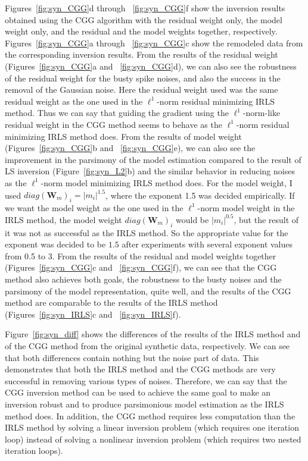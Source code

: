 Figures~\ref{fig:syn_CGG}d through ~\ref{fig:syn_CGG}f show the inversion results 
obtained using the CGG algorithm with the residual weight only,
the model weight only, and the residual and the model weights together, respectively.  
Figures~\ref{fig:syn_CGG}a through ~\ref{fig:syn_CGG}c show the remodeled data 
from the corresponding inversion results.
From the results of the residual weight (Figures~\ref{fig:syn_CGG}a and ~\ref{fig:syn_CGG}d),
we can also see the robustness of the residual weight for the busty spike noises,
and also the success in the removal of the Gaussian noise.
Here the residual weight used was the same residual weight as the one used
in the $\ell^1$-norm residual minimizing IRLS method.
Thus we can say that guiding the gradient using the $\ell^1$-norm-like residual weight 
in the CGG method seems to behave as the $\ell^1$-norm residual minimizing IRLS method does. 
From the results of model weight (Figures~\ref{fig:syn_CGG}b and ~\ref{fig:syn_CGG}e),
we can also see the improvement in the parsimony of the model estimation
compared to the result of LS inversion (Figure~\ref{fig:syn_L2}b)
and the similar behavior in reducing noises as the $\ell^1$-norm model minimizing IRLS method does.
For the model weight, I used $diag({\mathbf W_m})_i = |m_i|^{1.5}$, where the exponent 1.5 was decided empirically.
If we want the model weight as the one used in the $\ell^1$-norm model weight in the IRLS method,
the model weight $diag({\mathbf W_m})_i$ would be $|m_i|^{0.5}$, but the result of it
was not as successful as the IRLS method.
So the appropriate value for the exponent was decided to be $1.5$ 
after experiments with several exponent values from 0.5 to 3.  
From the results of the residual and model weights together 
(Figures~\ref{fig:syn_CGG}c and ~\ref{fig:syn_CGG}f),
we can see that the CGG method also achieves both goals, the robustness to the busty noises
and the parsimony of the model representation, quite well,
and the results of the CGG method are comparable to the results of the IRLS method
(Figures~\ref{fig:syn_IRLS}c and ~\ref{fig:syn_IRLS}f).

Figure~\ref{fig:syn_diff} shows the differences of the results of the IRLS method 
and of the CGG method from the original synthetic data, respectively.
We can see that both differences contain nothing but the noise part of data. 
This demonstrates that both the IRLS method and the CGG methods 
are very successful in removing various types of noises.
Therefore, we can say that the CGG inversion method 
can be used to achieve the same goal to make an inversion robust and
to produce parsimonious model estimation as the IRLS method does.
In addition, the CGG method requires less computation than the IRLS method
by solving a linear inversion problem (which requires one iteration loop)
instead of solving a nonlinear inversion problem (which requires two nested iteration loops).

